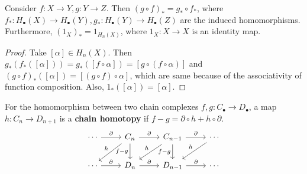 \begin{prop} Consider $f:X\rightarrow Y, g:Y\rightarrow Z$. Then $(g\circ f)_*=g_*\circ f_*$, where $f_*:H_\bullet(X)\rightarrow H_\bullet(Y), g_*:H_\bullet(Y)\rightarrow H_\bullet(Z)$ are the induced homomorphisms. Furthermore, $(1_X)_*=1_{H_n(X)}$, where $1_X:X\rightarrow X$ is an identity map.
\end{prop}
\begin{proof}
Take $[\alpha]\in H_n(X)$. Then $g_*(f_*([\alpha]))=g_*([f\circ \alpha])=[g\circ (f\circ \alpha)]$ and $(g\circ f)_*([\alpha])=[(g\circ f)\circ \alpha]$, which are same because of the associativity of function composition. Also, $1_*([\alpha])=[\alpha]$.
\end{proof}

\begin{defn}
For the homomorphism between two chain complexes $f,g:C_\bullet\rightarrow D_\bullet$, a map $h:C_n\rightarrow D_{n+1}$ is a \textbf{chain homotopy} if $f-g=\partial\circ h+h\circ \partial$. 
\begin{equation}
\begin{tikzcd}
\cdots \arrow{r}{\partial} & C_n \arrow{r}{\partial} \arrow[swap]{d}{f-g} \arrow[swap]{dl}{h}  & C_{n-1} \arrow{r}{\partial} \arrow[swap]{d}{f-g} \arrow[swap]{dl}{h} & \cdots \arrow[swap]{dl}{h} \\
\cdots \arrow{r}{\partial} & D_n \arrow{r}{\partial} & D_{n-1} \arrow{r}{\partial} & \cdots
\end{tikzcd}
\end{equation}
\end{defn}

